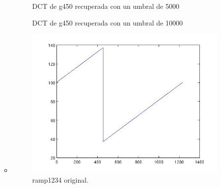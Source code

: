 \documentclass[10pt, a4paper]{article}
\begin{document}
\begin{itemize}
\begin{itemize}
\begin{figure}[H] %
\hfill
\begin{minipage}[t]{.45\textwidth}
\begin{center}
\caption{DCT de g450 recuperada con un umbral de 5000}
\label{fig-tc1}
\end{center}
\end{minipage}
\hfill
\begin{minipage}[t]{.45\textwidth}
\begin{center}
\caption{DCT de g450 recuperada con un umbral de 10000}
\label{fig-tc2}
\end{center}
\end{minipage}
\hfill
\end{figure} 

\item {}

\begin{figure}[H] %
\begin{center}
\includegraphics[width=300pt]{./ramp1234.jpg}
\caption[h]{ramp1234 original.}
\end{center}
\end{figure}


\end{itemize}
\end{itemize}
\end{document}
